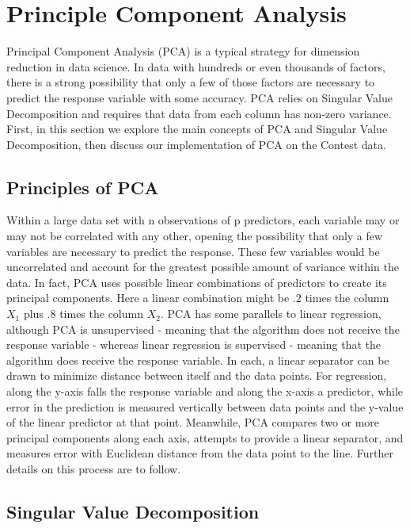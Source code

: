\section{Principle Component Analysis}

Principal Component Analysis (PCA) is a typical strategy for dimension reduction in data science. In data with hundreds or even thousands of factors, there is a strong possibility that only a few of those factors are necessary to predict the response variable with some accuracy. PCA relies on Singular Value Decomposition and requires that data from each column has non-zero variance. First, in this section we explore the main concepts of PCA and Singular Value Decomposition, then discuss our implementation of PCA on the Contest data.\newline

\subsection{Principles of PCA}

Within a large data set with n observations of p predictors, each variable may or may not be correlated with any other, opening the possibility that only a few variables are necessary to predict the response. These few variables would be uncorrelated and account for the greatest possible amount of variance within the data. In fact, PCA uses possible linear combinations of predictors to create its principal components. Here a linear combination might be .2 times the column $X_{1}$ plus .8 times the column $X_{2}$. PCA has some parallels to linear regression, although PCA is unsupervised - meaning that the algorithm does not receive the response variable - whereas linear regression is supervised - meaning that the algorithm does receive the response variable. In each, a linear separator can be drawn to minimize distance between itself and the data points. For regression, along the y-axis falls the response variable and along the x-axis a predictor, while error in the prediction is measured vertically between data points and the y-value of the linear predictor at that point. Meanwhile, PCA compares two or more principal components along each axis, attempts to provide a linear separator, and measures error with Euclidean distance from the data point to the line. Further details on this process are to follow. 

\subsection{Singular Value Decomposition}

